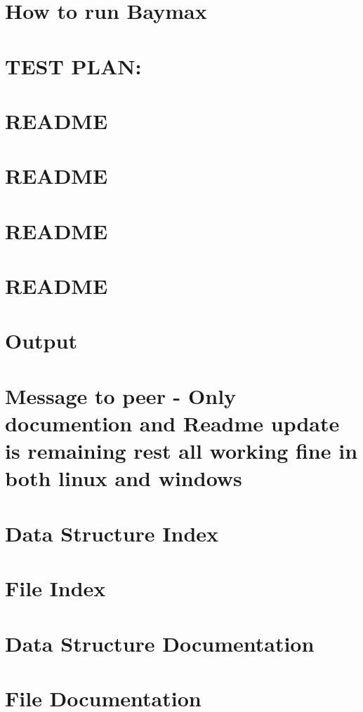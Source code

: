 \let\mypdfximage\pdfximage\def\pdfximage{\immediate\mypdfximage}\documentclass[twoside]{book}
\newcommand{\+}{\discretionary{\mbox{\scriptsize$\hookleftarrow$}}{}{}}
\newcommand{\clearemptydoublepage}{%
  \newpage{\pagestyle{empty}\cleardoublepage}%
}
\begin{document}
\chapter{How to run Baymax}
\label{md_3__implementation__r_e_a_d_m_e}

\chapter{TEST PLAN\+:}
\label{md_4__test__plan__r_e_a_d_m_e}

\chapter{README}
\label{md_5__report__r_e_a_d_m_e}

\chapter{README}
\label{md_6__images_and__videos_csv_images__r_e_a_d_m_e}

\chapter{README}
\label{md_6__images_and__videos__r_e_a_d_m_e}

\chapter{README}
\label{md_7__other__r_e_a_d_m_e}

\chapter{Output}
\label{md__output__r_e_a_d_m_e}

\chapter{Message to peer -\/ Only documention and Readme update is remaining rest all working fine in both linux and windows}
\label{md__r_e_a_d_m_e}

\chapter{Data Structure Index}

\chapter{File Index}

\chapter{Data Structure Documentation}


\chapter{File Documentation}






\backmatter
\newpage
{}
\clearemptydoublepage
{}
\printindex
\end{document}
